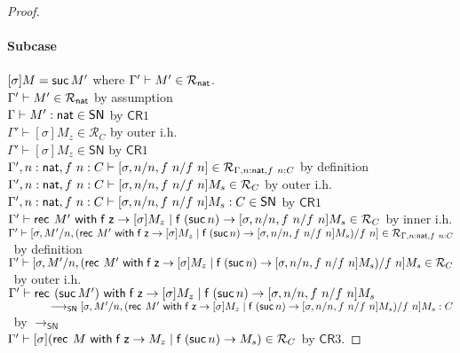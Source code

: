 \documentclass{article}
\newcommand{\SN}{\mathsf{SN}}
\newcommand{\CR}{\textsf{CR}}
\newcommand{\denot}[1]{\mathcal{R}_{#1}}
\newcommand{\inden}[3]{#1 \vdash #2 \in \denot{#3}}
\newcommand{\redSN}{\longrightarrow_\SN}
\begin{document}
\begin{proof}
 \paragraph{Subcase } $[\sigma]M = {\mathsf{suc}}\, M'$ where $\inden{\Gamma'}{M'}{\nat}$.
 \\
 $\inden{\Gamma'}{M'}{\nat}$ \hfill by assumption \\
 $\Gamma \vdash M' : \nat \in \SN$ \hfill by $\CR1$ \\
 $\inden{\Gamma'}{[\sigma]M_z}{C}$ \hfill by outer i.h. \\
 $\Gamma' \vdash [\sigma]M_z \in \SN$ \hfill by $\CR1$ \\
 $\inden{\Gamma', n \hastype \nat, f~n \hastype C}{[\sigma, n/n, f~n/f~n]}{\Gamma, n:\nat, f~n:C}$ \hfill by definition \\
 $\inden{\Gamma', n \hastype \nat, f~n \hastype C}{[\sigma, n/n, f~n/f~n]M_s}{C}$ \hfill by outer i.h. \\
 $\Gamma', n \hastype \nat, f~n \hastype C \vdash [\sigma, n/n, f~n/f~n]M_s : C \in \SN$ \hfill by $\CR1$ \\
 $\inden{\Gamma'}{\recnat{M'}{[\sigma]M_z}{[\sigma, n/n, f~n/f~n]M_s}}{C}$ \hfill by inner i.h. \\
 $\inden{\Gamma'}{[\sigma, M'/n, (\recnat{M'}{[\sigma]M_z}{[\sigma, n/n, f~n/f~n]M_s})/f~n]}{\Gamma, n:\nat, f~n:C}$ \\
 $~$ \hfill by definition \\
 $\inden{\Gamma'}{[\sigma, M'/n, (\recnat{M'}{[\sigma]M_z}{[\sigma, n/n, f~n/f~n]M_s})/f~n]M_s}{C}$ \\
 $~$ \hfill by outer i.h. \\
 $\Gamma' \vdash \mathsf{rec}^{}~({\mathsf{suc}}\, M')~\mathsf{with}\;{\mathsf{f}}\;\mathsf{z} \rightarrow [\sigma]M_z \mid {\mathsf{f}}\;({\mathsf{suc}}\, n) \rightarrow {[\sigma, n/n, f~n/f~n]M_s} $ \\
 $\qquad \qquad \redSN
 [\sigma, M'/n, (\recnat{M'}{[\sigma]M_z}{[\sigma, n/n, f~n/f~n]M_s})/f~n]M_s : C$ \\
 $~$ \hfill by $\redSN$ \\
 $\inden{\Gamma'}{[\sigma](\recnat{M}{M_z}{M_s})}{C}$ \hfill by $\CR3$.


\end{proof}
\end{document}
